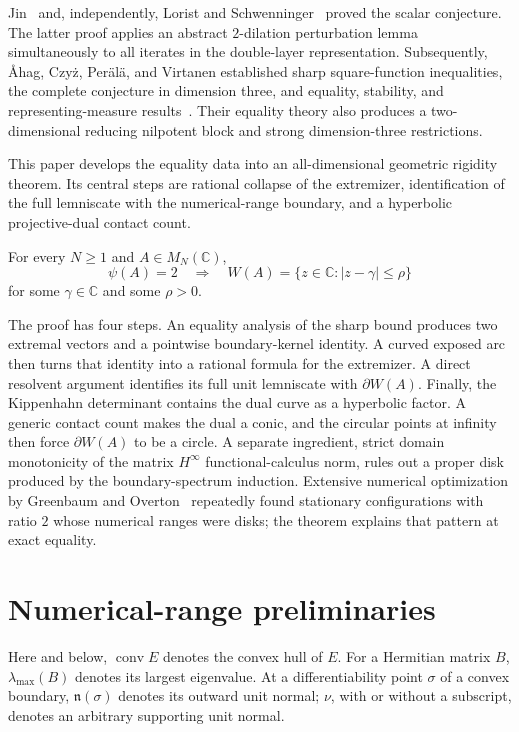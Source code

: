 \documentclass[preprints,article,submit,oneauthor]{Definitions/mdpi}
\numberwithin{equation}{section}
\newcommand{\C}{\mathbb C}
\newcommand{\conv}{\operatorname{conv}}
\begin{document}
Jin~\cite{Jin2026} and, independently, Lorist and
Schwenninger~\cite{LoristSchwenninger2026} proved the scalar conjecture.  The
latter proof applies an abstract \(2\)-dilation perturbation lemma
simultaneously to all iterates in the double-layer representation.
Subsequently, {\AA}hag, Czy\.z, Per\"al\"a, and Virtanen established sharp
square-function inequalities, the complete conjecture in dimension three,
and equality, stability, and representing-measure
results~\cite{AhagEtAl2026}.  Their equality theory also produces a
two-dimensional reducing nilpotent block and strong dimension-three
restrictions.

This paper develops the equality data into an all-dimensional geometric
rigidity theorem.  Its central steps are rational collapse of the extremizer,
identification of the full lemniscate with the numerical-range boundary, and
a hyperbolic projective-dual contact count.

\begin{Theorem}\label{thm:main}
For every \(N\geq1\) and \(A\in M_N(\C)\),
\[
 \psi(A)=2\quad\Longrightarrow\quad
 W(A)=\{z\in\C:|z-\gamma|\leq\rho\}
\]
for some \(\gamma\in\C\) and some \(\rho>0\).
\end{Theorem}

The proof has four steps.  An equality analysis of the sharp bound produces
two extremal vectors and a pointwise boundary-kernel identity.  A curved
exposed arc then turns that identity into a rational formula for the
extremizer.  A direct resolvent argument identifies its full unit lemniscate
with \(\partial W(A)\).  Finally, the Kippenhahn determinant contains the dual
curve as a hyperbolic factor.  A generic contact count makes the dual a conic,
and the circular points at infinity then force \(\partial W(A)\) to be a
circle.  A separate ingredient, strict domain monotonicity of the matrix
\(H^\infty\) functional-calculus norm, rules out a proper disk produced by the
boundary-spectrum induction.
Extensive numerical optimization by Greenbaum and
Overton~\cite{GreenbaumOverton2018} repeatedly found stationary
configurations with ratio \(2\) whose numerical ranges were disks; the theorem
explains that pattern at exact equality.

\section{Numerical-range preliminaries}

Here and below, \(\conv E\) denotes the convex hull of \(E\).
For a Hermitian matrix \(B\), \(\lambda_{\max}(B)\) denotes its largest
eigenvalue.  At a differentiability point \(\sigma\) of a convex boundary,
\(\mathfrak n(\sigma)\) denotes its outward unit normal; \(\nu\), with or
without a subscript, denotes an arbitrary supporting unit normal.
\end{document}
